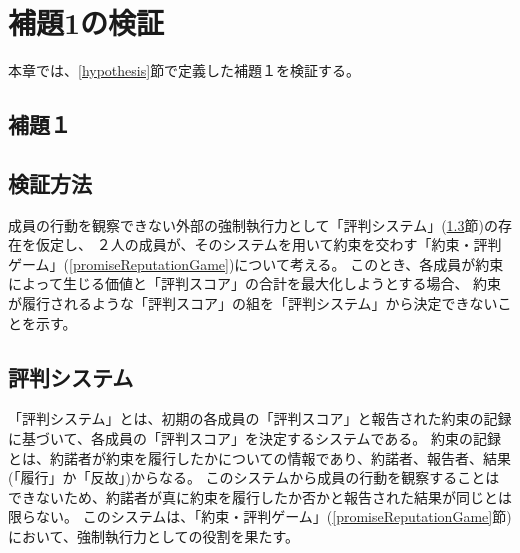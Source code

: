 \chapter{補題1の検証}
本章では、\ref{hypothesis}節で定義した補題１を検証する。

\section{補題１}
\firstLemma

\section{検証方法}
成員の行動を観察できない外部の強制執行力として「評判システム」(\ref{reputationSystem}節)の存在を仮定し、
２人の成員が、そのシステムを用いて約束を交わす「約束・評判ゲーム」(\ref{promiseReputationGame})について考える。
このとき、各成員が約束によって生じる価値と「評判スコア」の合計を最大化しようとする場合、
約束が履行されるような「評判スコア」の組を「評判システム」から決定できないことを示す。


\section{評判システム}
\label{reputationSystem}
「評判システム」とは、初期の各成員の「評判スコア」と報告された約束の記録に基づいて、各成員の「評判スコア」を決定するシステムである。
約束の記録とは、約諾者が約束を履行したかについての情報であり、約諾者、報告者、結果(「履行」か「反故」)からなる。
このシステムから成員の行動を観察することはできないため、約諾者が真に約束を履行したか否かと報告された結果が同じとは限らない。
このシステムは、「約束・評判ゲーム」(\ref{promiseReputationGame}節)において、強制執行力としての役割を果たす。


